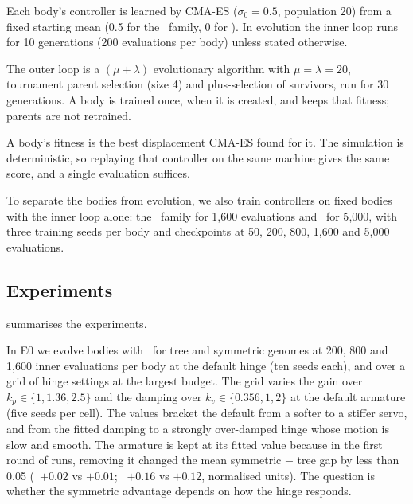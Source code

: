 Each body's controller is learned by CMA-ES ($\sigma_0 = 0.5$, population 20) from a fixed starting mean (0.5 for the \bb\ family, 0 for \dann). In evolution the inner loop runs for 10 generations (200 evaluations per body) unless stated otherwise.

The outer loop is a $(\mu + \lambda)$ evolutionary algorithm with $\mu = \lambda = 20$, tournament parent selection (size 4) and plus-selection of survivors, run for 30 generations. A body is trained once, when it is created, and keeps that fitness; parents are not retrained.

A body's fitness is the best displacement CMA-ES found for it. The simulation is deterministic, so replaying that controller on the same machine gives the same score, and a single evaluation suffices.

To separate the bodies from evolution, we also train controllers on fixed bodies with the inner loop alone: the \bb\ family for 1{,}600 evaluations and \dann\ for 5{,}000, with three training seeds per body and checkpoints at 50, 200, 800, 1{,}600 and 5{,}000 evaluations.

\subsection{Experiments}
\label{sec:experiments}

 summarises the experiments.

In E0 we evolve bodies with \dann\ for tree and symmetric genomes at 200, 800 and 1{,}600 inner evaluations per body at the default hinge (ten seeds each), and over a grid of hinge settings at the largest budget. The grid varies the gain over $k_p \in \{1, 1.36, 2.5\}$ and the damping over $k_v \in \{0.356, 1, 2\}$ at the default armature (five seeds per cell). The values bracket the default from a softer to a stiffer servo, and from the fitted damping to a strongly over-damped hinge whose motion is slow and smooth. The armature is kept at its fitted value because in the first round of runs, removing it changed the mean symmetric $-$ tree gap by less than 0.05 (\dann\ $+0.02$ vs $+0.01$; \bb\ $+0.16$ vs $+0.12$, normalised units). The question is whether the symmetric advantage depends on how the hinge responds.

